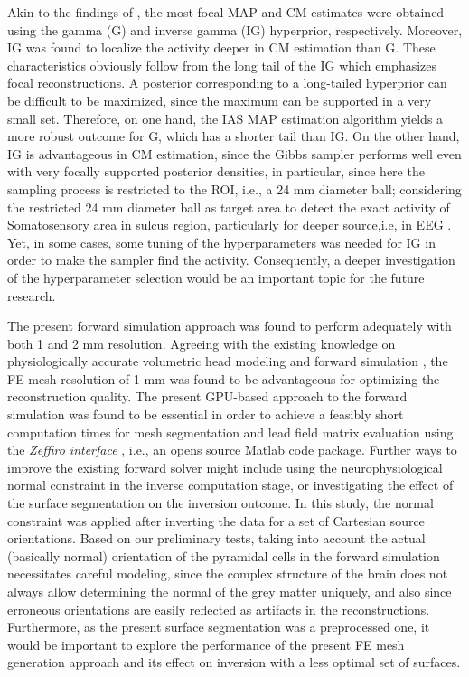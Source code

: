\documentclass[5p]{elsarticle}
\begin{document}
Akin to the findings of \cite{calvetti2009}, the most focal MAP and CM estimates were obtained using the gamma (G) and inverse gamma (IG) hyperprior, respectively. Moreover, IG was found to localize the activity deeper in CM estimation than G. These characteristics obviously follow from the long tail of the IG which emphasizes focal reconstructions. A posterior corresponding to a long-tailed hyperprior can be difficult to be maximized, since the maximum can be supported in a very small set. Therefore, on one hand, the  IAS MAP estimation algorithm yields a more robust outcome for G, which has a  shorter tail than IG. On the other hand, IG is advantageous in CM estimation, since the Gibbs sampler performs well even with very focally supported posterior densities, in particular, since here the sampling process is restricted to the ROI, i.e., a 24 mm diameter ball;  considering the restricted 24 mm diameter ball as target area to detect the exact activity of Somatosensory area in sulcus region, particularly for deeper source,i.e, in EEG \cite{hari2018ifcn}. %
Yet, in some cases, some tuning of the hyperparameters was needed for IG in order to make the sampler find the activity. Consequently, a deeper investigation of the hyperparameter selection would  be an important topic for the future research.

The present forward simulation approach was found to perform adequately with both 1 and 2 mm resolution. Agreeing with the existing knowledge on physiologically accurate volumetric head modeling and forward simulation \cite{demunck2012,rullmann2009eeg,wolters2007geometry}, the FE mesh resolution of 1 mm was found to be advantageous for optimizing the reconstruction quality.  The present GPU-based approach to the forward simulation was found to be essential in order to achieve a feasibly short computation times for mesh segmentation and lead field matrix evaluation using the {\em Zeffiro interface} \cite{ZeffiroInterface}, i.e., an opens source Matlab code package. Further ways to improve the existing forward solver might include using the neurophysiological normal constraint   in the inverse computation stage, or investigating the effect of the surface segmentation on the inversion outcome. In this study, the normal constraint was applied after inverting the data for a set of Cartesian source orientations. Based on our preliminary tests, taking into  account the actual (basically normal) orientation of the pyramidal cells in the forward simulation necessitates careful modeling, since the complex structure of the brain does not always allow determining the normal of the grey matter uniquely, and also since erroneous orientations are easily reflected as artifacts in the reconstructions. Furthermore, as the present surface segmentation was a preprocessed one, it would be important to explore the performance of the present FE mesh generation approach and its effect on inversion with a less optimal set of surfaces.
\end{document}
